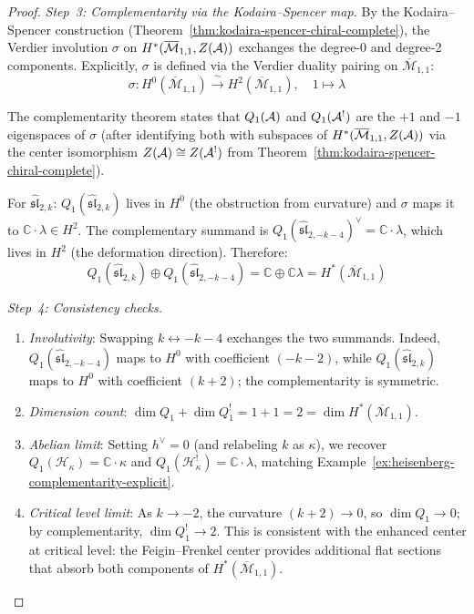 \begin{proof}
\emph{Step~3: Complementarity via the Kodaira--Spencer map.}
By the Kodaira--Spencer construction (Theorem~\ref{thm:kodaira-spencer-chiral-complete}), the Verdier involution $\sigma$ on $H^*(\overline{\mathcal{M}}_{1,1}, Z(\mathcal{A}))$ exchanges the degree-0 and degree-2 components.  Explicitly, $\sigma$ is defined via the Verdier duality pairing on $\overline{\mathcal{M}}_{1,1}$:
\begin{equation}
\sigma: H^0(\overline{\mathcal{M}}_{1,1}) \xrightarrow{\;\sim\;} H^2(\overline{\mathcal{M}}_{1,1}), \quad 1 \mapsto \lambda
\end{equation}

The complementarity theorem states that $Q_1(\mathcal{A})$ and $Q_1(\mathcal{A}^!)$ are the $+1$ and $-1$ eigenspaces of $\sigma$ (after identifying both with subspaces of $H^*(\overline{\mathcal{M}}_{1,1}, Z(\mathcal{A}))$ via the center isomorphism $Z(\mathcal{A}) \cong Z(\mathcal{A}^!)$ from Theorem~\ref{thm:kodaira-spencer-chiral-complete}).

For $\widehat{\mathfrak{sl}}_{2,k}$: $Q_1(\widehat{\mathfrak{sl}}_{2,k})$ lives in $H^0$ (the obstruction from curvature) and $\sigma$ maps it to $\mathbb{C} \cdot \lambda \in H^2$.  The complementary summand is $Q_1(\widehat{\mathfrak{sl}}_{2,-k-4})^\vee = \mathbb{C} \cdot \lambda$, which lives in $H^2$ (the deformation direction).  Therefore:
\begin{equation}
Q_1(\widehat{\mathfrak{sl}}_{2,k}) \oplus Q_1(\widehat{\mathfrak{sl}}_{2,-k-4}) = \mathbb{C} \oplus \mathbb{C}\lambda = H^*(\overline{\mathcal{M}}_{1,1})
\end{equation}

\emph{Step~4: Consistency checks.}
\begin{enumerate}
\item \emph{Involutivity}: Swapping $k \leftrightarrow -k-4$ exchanges the two summands.  Indeed, $Q_1(\widehat{\mathfrak{sl}}_{2,-k-4})$ maps to $H^0$ with coefficient $(-k-2)$, while $Q_1(\widehat{\mathfrak{sl}}_{2,k})$ maps to $H^0$ with coefficient $(k+2)$; the complementarity is symmetric.
\item \emph{Dimension count}: $\dim Q_1 + \dim Q_1^! = 1 + 1 = 2 = \dim H^*(\overline{\mathcal{M}}_{1,1})$. \checkmark
\item \emph{Abelian limit}: Setting $h^\vee = 0$ (and relabeling $k$ as $\kappa$), we recover $Q_1(\mathcal{H}_\kappa) = \mathbb{C} \cdot \kappa$ and $Q_1(\mathcal{H}_\kappa^!) = \mathbb{C} \cdot \lambda$, matching Example~\ref{ex:heisenberg-complementarity-explicit}. \checkmark
\item \emph{Critical level limit}: As $k \to -2$, the curvature $(k+2) \to 0$, so $\dim Q_1 \to 0$; by complementarity, $\dim Q_1^! \to 2$.  This is consistent with the enhanced center at critical level: the Feigin--Frenkel center provides additional flat sections that absorb both components of $H^*(\overline{\mathcal{M}}_{1,1})$. \checkmark
\end{enumerate}
\end{proof}

